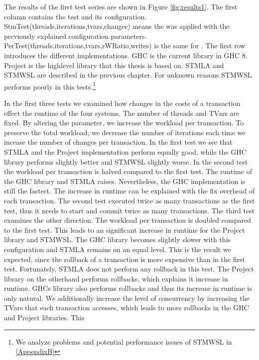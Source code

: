 The results of the first test series are shown in Figure \ref{fig:results1}. 
The first column contains the test and its configuration.
StmTest(threads,iterations,tvars,changes) means the  was applied with the previously explained configuration parameters.
PerTest(threads,iterations,tvars,rWRatio,writes) is the same for . The first row introduces the different 
implementations. GHC is the current library in GHC 8. Project is the highlevel library that this thesis is based on.
STMLA and STMWSL are described in the previous chapter. For unknown reasons STMWSL performs poorly in this tests.\footnote{We 
analyze problems and potential performance issues of STMWSL in \ref{AppendixB}}

In the first three tests we examined how changes in the costs of a transaction effect the runtime of the four systems. 
The number of threads and TVars are fixed. By altering the  parameter, we increase the workload per 
transaction. To preserve the total workload, we decrease the number of iterations each time we incease the number
of changes per transaction. In the first test we see that STMLA and the Project implementation perform equally good, while the GHC 
library performs slightly better and STMWSL slightly worse. In the second test the workload per transaction is halved compared to the
first test. The runtime of the GHC library and STMLA raises. Nevertheless, the GHC implementation is still the fastest. The increase 
in runtime can be explained with the fix overhead of each transaction. The second test executed twice as many transactions as
the first test, thus it needs to start and commit twice as many transactions.
The third test examines the other direction. The workload per transaction is doubled compared to the first test. 
This leads to an significant increase in runtime for the Project library and STMWSL. The GHC library becomes 
slightly slower with this configuration and STMLA remains on an equal level. This is the result we expected, since the rollback of 
a transaction is more expensive than in the first test. Fortunately, STMLA does not perform any rollback in this test. The Project
library on the otherhand performs rollbacks, which explains it increase in runtime. GHCs library also performs rollbacks
and thus its increase in runtime is only natural. We additionally increase the level of concurrency by increasing the 
TVars that each transaction accesses, which leads to more rollbacks in the GHC and Project libraries. This 

